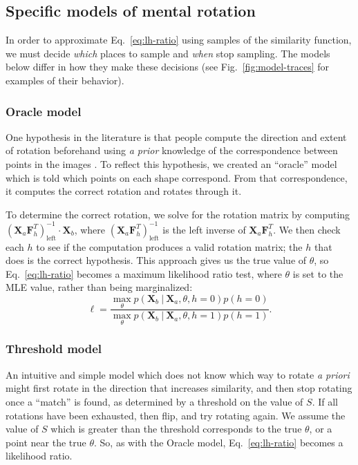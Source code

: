 \documentclass[10pt,letterpaper]{article}
\newcommand{\Xa}[0]{\mathbf{X}_a}
\newcommand{\Xb}[0]{\mathbf{X}_b}
\newcommand{\F}[0]{\mathbf{F}}
\newcommand{\hi}[0]{h=0}
\newcommand{\hf}[0]{h=1}
\newcommand{\Oc}[0]{Oracle}
\begin{document}
\subsection{Specific models of mental rotation}

In order to approximate Eq.~\ref{eq:lh-ratio} using samples of the
similarity function, we must decide \textit{which} places to sample
and \textit{when} stop sampling. The models below differ in how they
make these decisions (see Fig.~\ref{fig:model-traces} for examples of
their behavior).

\subsubsection{Oracle model}

One hypothesis in the literature is that people compute the direction
and extent of rotation beforehand using \textit{a prior} knowledge of
the correspondence between points in the images
\cite{Funt:1983wn,Just:1985uu}.  To reflect this hypothesis, we
created an ``oracle'' model which is told which points on each shape
correspond. From that correspondence, it computes the correct rotation
and rotates through it.

To determine the correct rotation, we solve for the rotation matrix by
computing $(\Xa \F_h^T)_\mathrm{left}^{-1}\cdot{}\Xb$, where
$(\Xa\F_h^T)_\mathrm{left}^{-1}$ is the left inverse of
$\Xa\F_h^T$. We then check each $h$ to see if the computation produces
a valid rotation matrix; the $h$ that does is the correct
hypothesis. This approach gives us the true value of $\theta$, so
Eq.~\ref{eq:lh-ratio} becomes a maximum likelihood ratio test, where
$\theta$ is set to the MLE value, rather than being marginalized:
\begin{equation}
  \ell = \frac{\max_\theta p(\Xb\ \vert\ \Xa, \theta, \hi)p(\hi)}{\max_\theta p(\Xb\ \vert\ \Xa, \theta, \hf)p(\hf)}.
  \label{eq:mle-lh-ratio}
\end{equation}

\subsubsection{Threshold model}

An intuitive and simple model which does not know which way to rotate
\textit{a priori} might first rotate in the direction that increases
similarity, and then stop rotating once a ``match'' is found, as
determined by a threshold on the value of $S$. If all rotations have
been exhausted, then flip, and try rotating again. We assume the value
of $S$ which is greater than the threshold corresponds to the true
$\theta$, or a point near the true $\theta$. So, as with the \Oc{}
model, Eq.~\ref{eq:lh-ratio} becomes a likelihood ratio.
\end{document}
